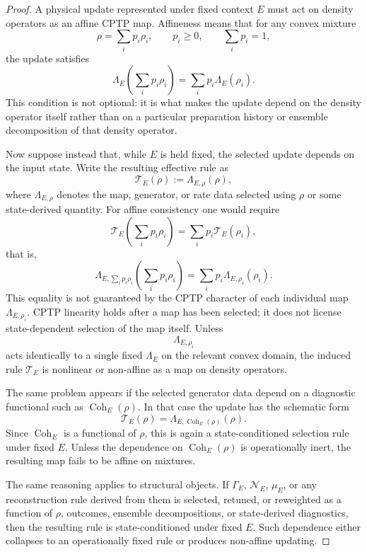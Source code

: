 \documentclass[aps,prx,onecolumn,11pt]{revtex4-2}
\theoremstyle{plain}
\theoremstyle{definition}
\theoremstyle{remark}
\newcommand{\Coh}{\operatorname{Coh}}       %
\begin{document}
\begin{proof}
A physical update represented under fixed context \(E\) must act on
density operators as an affine CPTP map. Affineness means that for any
convex mixture
\[
\rho=\sum_i p_i\rho_i,
\qquad
p_i\geq 0,
\qquad
\sum_i p_i=1,
\]
the update satisfies
\[
\Lambda_E\!\left(\sum_i p_i\rho_i\right)
=
\sum_i p_i\Lambda_E(\rho_i).
\]
This condition is not optional: it is what makes the update depend on
the density operator itself rather than on a particular preparation
history or ensemble decomposition of that density operator.

Now suppose instead that, while \(E\) is held fixed, the selected update
depends on the input state. Write the resulting effective rule as
\[
\mathcal{T}_E(\rho)
:=
\Lambda_{E,\rho}(\rho),
\]
where \(\Lambda_{E,\rho}\) denotes the map, generator, or rate data
selected using \(\rho\) or some state-derived quantity. For affine
consistency one would require
\[
\mathcal{T}_E\!\left(\sum_i p_i\rho_i\right)
=
\sum_i p_i\mathcal{T}_E(\rho_i),
\]
that is,
\[
\Lambda_{E,\sum_i p_i\rho_i}
\!\left(\sum_i p_i\rho_i\right)
=
\sum_i p_i\Lambda_{E,\rho_i}(\rho_i).
\]
This equality is not guaranteed by the CPTP character of each
individual map \(\Lambda_{E,\rho_i}\). CPTP linearity holds after a map
has been selected; it does not license state-dependent selection of the
map itself. Unless
\[
\Lambda_{E,\rho_i}
\]
acts identically to a single fixed \(\Lambda_E\) on the relevant convex
domain, the induced rule \(\mathcal{T}_E\) is nonlinear or non-affine as
a map on density operators.

The same problem appears if the selected generator data depend on a
diagnostic functional such as \(\Coh_E(\rho)\). In that case the update
has the schematic form
\[
\mathcal{T}_E(\rho)
=
\Lambda_{E,\Coh_E(\rho)}(\rho).
\]
Since \(\Coh_E\) is a functional of \(\rho\), this is again a
state-conditioned selection rule under fixed \(E\). Unless the
dependence on \(\Coh_E(\rho)\) is operationally inert, the resulting
map fails to be affine on mixtures.

The same reasoning applies to structural objects. If
\(\Gamma_E\), \(\mathcal N_E\), \(\mu_E\), or any reconstruction rule
derived from them is selected, retuned, or reweighted as a function of
\(\rho\), outcomes, ensemble decompositions, or state-derived
diagnostics, then the resulting rule is state-conditioned under fixed
\(E\). Such dependence either collapses to an operationally fixed rule
or produces non-affine updating.


\end{proof}
\end{document}
